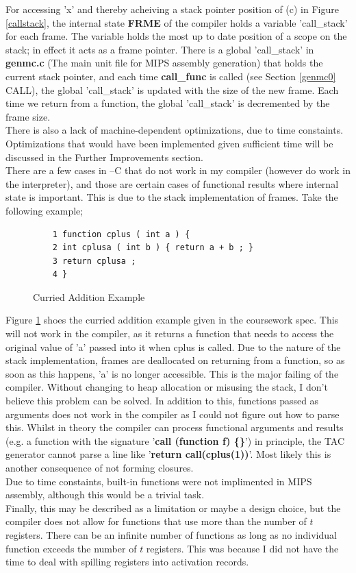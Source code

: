 \documentclass[12pt]{article}
\begin{document}
For accessing 'x' and thereby acheiving a stack pointer position of (c) in Figure \ref{callstack}, the internal state \textbf{FRME} of the compiler holds a variable 'call\_stack' for each frame. The variable holds the most up to date position of a scope on the stack; in effect it acts as a frame pointer. There is a global 'call\_stack' in \textbf{genmc.c} (The main unit file for MIPS assembly generation) that holds the current stack pointer, and each time \textbf{call\_func} is called (see Section \ref{genmc0} CALL), the global 'call\_stack' is updated with the size of the new frame. Each time we return from a function, the global 'call\_stack' is decremented by the frame size. 
\\\newline There is also a lack of machine-dependent optimizations, due to time constaints. Optimizations that would have been implemented given sufficient time will be discussed in the Further Improvements section. \\\newline
There are a few cases in --C that do not work in my compiler (however do work in the interpreter), and those are certain cases of functional results where internal state is important. This is due to the stack implementation of frames. Take the following example; 
\begin{figure}[H]
  \begin{verbatim}
    1 function cplus ( int a ) {
    2 int cplusa ( int b ) { return a + b ; }
    3 return cplusa ;
    4 }
  \end{verbatim}
  \caption{Curried Addition Example}
  \label{cae}
\end{figure}
Figure \ref{cae} shoes the curried addition example given in the coursework spec. This will not work in the compiler, as it returns a function that needs to access the original value of 'a' passed into it when cplus is called. Due to the nature of the stack implementation, frames are deallocated on returning from a function, so as soon as this happens, 'a' is no longer accessible. This is the major failing of the compiler. Without changing to heap allocation or misusing the stack, I don't believe this problem can be solved. 
In addition to this, functions passed as arguments does not work in the compiler as I could not figure out how to parse this. Whilst in theory the compiler can process functional arguments and results (e.g. a function with the signature '\textbf{call (function f) \{\}}') in principle, the TAC generator cannot parse a line like '\textbf{return call(cplus(1))}'. Most likely this is another consequence of not forming closures. \\\newline 
Due to time constaints, built-in functions were not implimented in MIPS assembly, although this would be a trivial task. \\\newline
Finally, this may be described as a limitation or maybe a design choice, but the compiler does not allow for functions that use more than the number of $t$ registers. There can be an infinite number of functions as long as no individual function exceeds the number of $t$ registers. This was because I did not have the time to deal with spilling registers into activation records. 
\end{document}
